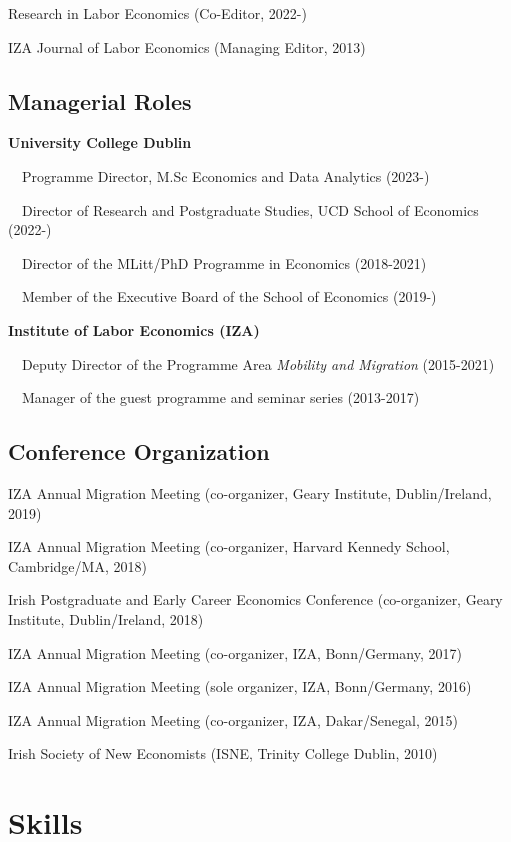 \documentclass[10pt,a4paper,]{article}
\begin{document}
Research in Labor Economics (Co-Editor, 2022-)

IZA Journal of Labor Economics (Managing Editor, 2013)

\hypertarget{managerial-roles}{%
\subsection{Managerial Roles}\label{managerial-roles}}

\textbf{University College Dublin}

~~Programme Director, M.Sc Economics and Data Analytics (2023-)

~~Director of Research and Postgraduate Studies, UCD School of Economics
(2022-)

~~Director of the MLitt/PhD Programme in Economics (2018-2021)

~~Member of the Executive Board of the School of Economics (2019-)

\medskip

\textbf{Institute of Labor Economics (IZA)}

~~Deputy Director of the Programme Area \emph{Mobility and Migration}
(2015-2021)

~~Manager of the guest programme and seminar series (2013-2017)

\hypertarget{conference-organization}{%
\subsection{Conference Organization}\label{conference-organization}}

IZA Annual Migration Meeting (co-organizer, Geary Institute,
Dublin/Ireland, 2019)

IZA Annual Migration Meeting (co-organizer, Harvard Kennedy School,
Cambridge/MA, 2018)

Irish Postgraduate and Early Career Economics Conference (co-organizer,
Geary Institute, Dublin/Ireland, 2018)

IZA Annual Migration Meeting (co-organizer, IZA, Bonn/Germany, 2017)

IZA Annual Migration Meeting (sole organizer, IZA, Bonn/Germany, 2016)

IZA Annual Migration Meeting (co-organizer, IZA, Dakar/Senegal, 2015)

Irish Society of New Economists (ISNE, Trinity College Dublin, 2010)

\hypertarget{skills}{%
\section{Skills}\label{skills}}
\end{document}
